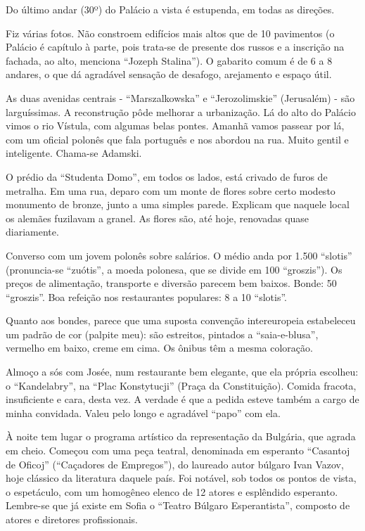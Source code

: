 Do último andar (30º) do Palácio a vista é estupenda, em todas as direções.

Fiz várias fotos. Não constroem edifícios mais altos que de 10 pavimentos (o Palácio é capítulo à parte, pois trata-se de presente dos russos e a inscrição na fachada, ao alto, menciona “Jozeph Stalina”). O gabarito comum é de 6 a 8 andares, o que dá agradável sensação de desafogo, arejamento e espaço útil.

As duas avenidas centrais - “Marszalkowska” e “Jerozolimskie” (Jerusalém) - são larguíssimas. A reconstrução pôde melhorar a urbanização. Lá do alto do Palácio vimos o rio Vístula, com algumas belas pontes. Amanhã vamos passear por lá, com um oficial polonês que fala português e nos abordou na rua. Muito gentil e inteligente. Chama-se Adamski.

O prédio da “Studenta Domo”, em todos os lados, está crivado de furos de metralha. Em uma rua, deparo com um monte de flores sobre certo modesto monumento de bronze, junto a uma simples parede. Explicam que naquele local os alemães fuzilavam a granel. As flores são, até hoje, renovadas quase diariamente.

Converso com um jovem polonês sobre salários. O médio anda por 1.500 “slotis” (pronuncia-se “zuótis”, a moeda polonesa, que se divide em 100 “groszis”). Os preços de alimentação, transporte e diversão parecem bem baixos. Bonde: 50 “groszis”. Boa refeição nos restaurantes populares: 8 a 10 “slotis”.

Quanto aos bondes, parece que uma suposta convenção intereuropeia estabeleceu um padrão de cor (palpite meu): são estreitos, pintados a “saia-e-blusa”, vermelho em baixo, creme em cima. Os ônibus têm a mesma coloração.

Almoço a sós com Josée, num restaurante bem elegante, que ela própria escolheu: o “Kandelabry”, na “Plac Konstytucji” (Praça da Constituição). Comida fracota, insuficiente e cara, desta vez. A verdade é que a pedida esteve também a cargo de minha convidada. Valeu pelo longo e agradável “papo” com ela.

À noite tem lugar o programa artístico da representação da Bulgária, que agrada em cheio. Começou com uma peça teatral, denominada em esperanto “Casantoj de Oficoj” (“Caçadores de Empregos”), do laureado autor búlgaro Ivan Vazov, hoje clássico da literatura daquele país. Foi notável, sob todos os pontos de vista, o espetáculo, com um homogêneo elenco de 12 atores e esplêndido esperanto. Lembre-se que já existe em Sofia o “Teatro Búlgaro Esperantista”, composto de atores e diretores profissionais.


